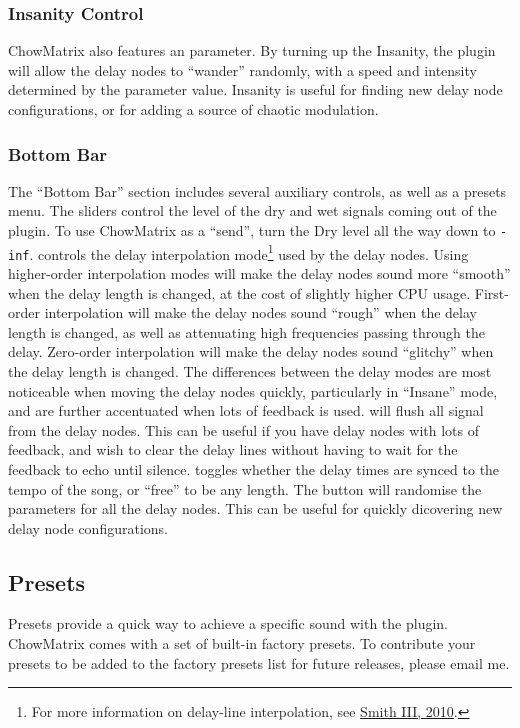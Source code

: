 \documentclass[landscape,twocolumn,a5paper]{manual}
\begin{document}
\subsubsection{Insanity Control}
ChowMatrix also features an  parameter.
By turning up the Insanity, the plugin will allow the delay
nodes to ``wander'' randomly, with a speed and intensity
determined by the parameter value. Insanity is useful for
finding new delay node configurations, or for adding a source
of chaotic modulation.

\subsubsection{Bottom Bar}
The ``Bottom Bar'' section includes several auxiliary controls,
as well as a presets menu.
\newpar
The  sliders control the level of the dry
and wet signals coming out of the plugin. To use ChowMatrix as
a ``send'', turn the Dry level all the way down to \texttt{-inf}.
\newpar
{} controls the delay interpolation
mode\footnote{For more information on delay-line interpolation, see \href{https://ccrma.stanford.edu/~jos/pasp/Delay_Line_Signal_Interpolation.html}{Smith III, 2010}.}
used by the delay nodes. Using higher-order interpolation modes
will make the delay nodes sound more ``smooth'' when the delay
length is changed, at the cost of slightly higher CPU usage.
First-order interpolation will make the delay nodes sound ``rough''
when the delay length is changed, as well as attenuating high
frequencies passing through the delay. Zero-order interpolation
will make the delay nodes sound  ``glitchy'' when the delay length
is changed. The differences between the delay modes are most noticeable
when moving the delay nodes quickly, particularly in ``Insane'' mode,
and are further accentuated when lots of feedback is used.
\newpar
{} will flush all signal from the delay nodes.
This can be useful if you have delay nodes with lots of feedback,
and wish to clear the delay lines without having to wait for
the feedback to echo until silence.
\newpar
{} toggles whether the delay times are synced
to the tempo of the song, or ``free'' to be any length.
\newpar
The  button will randomise the parameters
for all the delay nodes. This can be useful for quickly
dicovering new delay node configurations.

\subsection{Presets}
Presets provide a quick way to achieve a specific sound
with the plugin. ChowMatrix comes with a set of built-in
factory presets. To contribute your presets to be added
to the factory presets list for future releases, please
email me.
\end{document}
